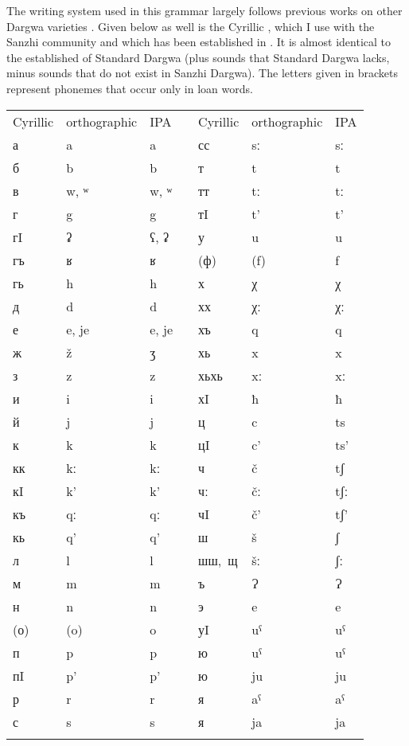 \label{Orthographic conventions}

The writing system used in this grammar largely follows previous works on other Dargwa varieties \citep{Sumbatova.Mutalov2003, Sumbatova.Lander2014}. Given below as well is the Cyrillic , which I use with the Sanzhi community and which has been established in \citet{Forker.Gadzhimuradov2017}. It is almost identical to the established  of Standard Dargwa (plus sounds that Standard Dargwa lacks, minus sounds that do not exist in Sanzhi Dargwa). The letters given in brackets represent phonemes that occur only in loan words.
%
\largerpage[2]
\begin{table}[h!]
	\centering
	\small
	\begin{tabularx}{0.8\textwidth}[]{lllXlll}
	\lsptoprule
			Cyrillic &	orthographic &	IPA	&	{}	&	Cyrillic &	orthographic &	IPA\\
		\cmidrule{1-3} \cmidrule{5-7}
			а	&	a	&	a	&	{}	&	сс	&	sː	&	sː\\
			б	&	b	&	b	&	{}	&	т	&	t	&	t\\
			в	&	w, ʷ	&	w, ʷ	&	{}	&	тт	&	tː	&	tː\\
			г	&	g 	&	g	&	{}	&	тI	&	t’	&	t’\\
			гI	&	ʡ	&	ʕ, ʡ	&	{}	&	у	&	u	&	u\\
			гъ	&	ʁ	&	ʁ	&	{}	&	(ф)	&	(f)	&	f\\
			гь	&	h	&	h	&	{}	&	х	&	χ	&	χ\\
			д	&	d	&	d	&	{}	&	хх	&	χː	&	χː\\
			е	&	e, je	&	e, je	&	{}	&	хъ	&	q	&	q\\	
			ж	&	ž	&	ʒ	&	{}	&	хь	&	x	&	x\\   
			з	&	z	&	z	&	{}	&	хьхь	&	xː	&	xː\\
			и	&	i	&	i	&	{}	&	хI	&	ħ	&	ħ\\
			й	&	j	&	j	&	{}	&	ц	&	c	&	ts\\
			к	&	k	&	k	&	{}	&	цI	&	c’	&	ts’\\
			кк	&	kː	&	kː	&	{}	&	ч	&	č	&	tʃ\\
			кI	&	k’	&	k’	&	{}	&	чː	&	čː	&	tʃː\\
			къ	&	qː	&	qː	&	{}	&	чI	&	č’	&	tʃ’\\
			кь	&	q’	&	q’	&	{}	&	ш	&	š	&	ʃ\\
			л	&	l	&	l	&	{}	&	\mbox{шш, щ}& šː	&	ʃː\\
			м	&	m	&	m	&	{}	&	ъ	&	Ɂ	&	Ɂ\\
			н	&	n	&	n	&	{}	&	э	&	e	&	e\\
			(о)	&	(o)	&	o	&	{}	&	уI	&	uˁ	&	uˁ\\
			п	&	p	&	p	&	{}	&	ю	&	uˁ	&	uˁ\\
			пI	&	p’	&	p’	&	{}	&	ю	&	ju	&	ju\\
			р	&	r	&	r	&	{}	&	я	&	aˁ	&	aˁ\\
			с	&	s	&	s	&	{}	&	я	&	ja	&	ja\\
			\lspbottomrule
	\end{tabularx}
\end{table}


